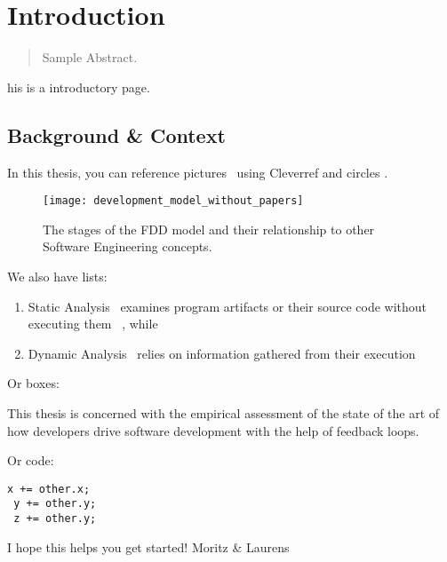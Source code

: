 \chapter{Introduction}
\label{introduction}

\begin{abstract}
Sample Abstract.
\end{abstract}


\newpage

his is a introductory page.




\section{Background \& Context}
In this thesis, you can reference pictures~ using Cleverref and circles .

\begin{figure}[htb]
	\centering
	\texttt{[image: development\_model\_without\_papers]}
	\caption{The stages of the FDD model and their relationship to other
          Software Engineering concepts.}
	\label{fig:devmodel}
\end{figure}

We also have lists:

\begin{enumerate}
  \item Static Analysis~ examines program artifacts or
    their source code without executing them~%
		, while
 \item Dynamic Analysis~ relies on information gathered from their
   execution~%
\end{enumerate}

Or boxes:

\begin{framed}
This thesis is concerned with the empirical assessment of the state of the art of how developers
drive software development with the help of feedback loops.
\end{framed}

Or code:
\begin{lstlisting}[caption={\textsc{TrinityCore}},label={lst:e1}]
 x += other.x;
 y += other.y;
 z += other.y;
\end{lstlisting}


I hope this helps you get started!
Moritz \& Laurens
